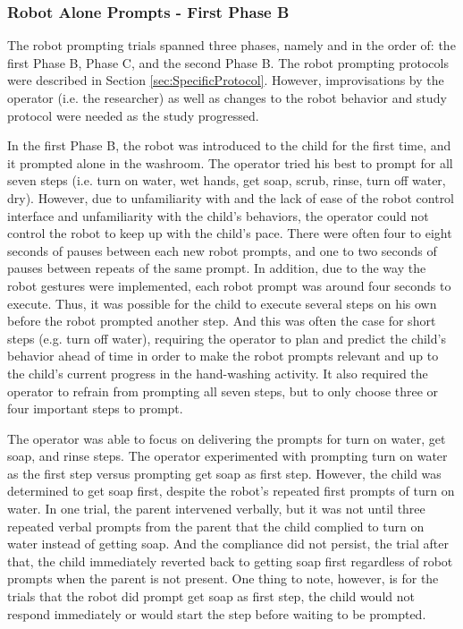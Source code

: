 \subsubsection{Robot Alone Prompts - First Phase B}
The robot prompting trials spanned three phases, namely and in the order of: the first Phase B, Phase C, and the second Phase B.  The robot prompting protocols were described in Section \ref{sec:SpecificProtocol}.  However, improvisations by the operator (i.e. the researcher) as well as changes to the robot behavior and study protocol were needed as the study progressed.

In the first Phase B, the robot was introduced to the child for the first time, and it prompted alone in the washroom.  The operator tried his best to prompt for all seven steps (i.e. turn on water, wet hands, get soap, scrub, rinse, turn off water, dry).  However, due to unfamiliarity with and the lack of ease of the robot control interface and unfamiliarity with the child's behaviors, the operator could not control the robot to keep up with the child's pace.  There were often four to eight seconds of pauses between each new robot prompts, and one to two seconds of pauses between repeats of the same prompt.  In addition, due to the way the robot gestures were implemented, each robot prompt was around four seconds to execute.  Thus, it was possible for the child to execute several steps on his own before the robot prompted another step.  And this was often the case for short steps (e.g. turn off water), requiring the operator to plan and predict the child's behavior ahead of time in order to make the robot prompts relevant and up to the child's current progress in the hand-washing activity.  It also required the operator to refrain from prompting all seven steps, but to only choose three or four important steps to prompt.

The operator was able to focus on delivering the prompts for turn on water, get soap, and rinse steps.  The operator experimented with prompting turn on water as the first step versus prompting get soap as first step.  However, the child was determined to get soap first, despite the robot's repeated first prompts of turn on water.  In one trial, the parent intervened verbally, but it was not until three repeated verbal prompts from the parent that the child complied to turn on water instead of getting soap.  And the compliance did not persist, the trial after that, the child immediately reverted back to getting soap first regardless of robot prompts when the parent is not present.  One thing to note, however, is for the trials that the robot did prompt get soap as first step, the child would not respond immediately or would start the step before waiting to be prompted.

